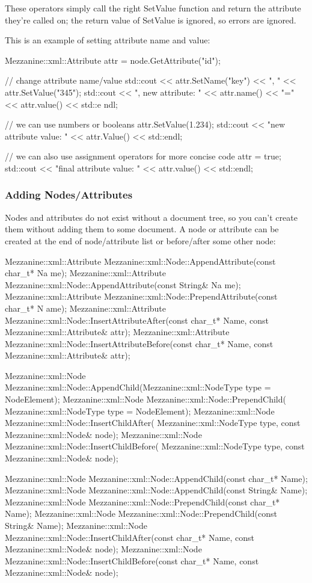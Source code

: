  These operators simply call the right SetValue function and return the attribute they're called on; the return value of SetValue is ignored, so errors are ignored. \par
 \par
 This is an example of setting attribute name and value: 
\begin{DoxyCode}
 Mezzanine::xml::Attribute attr = node.GetAttribute("id");

 // change attribute name/value
 std::cout << attr.SetName("key") << ", " << attr.SetValue("345");
 std::cout << ", new attribute: " << attr.name() << "=" << attr.value() << std::e
      ndl;

 // we can use numbers or booleans
 attr.SetValue(1.234);
 std::cout << "new attribute value: " << attr.Value() << std::endl;

 // we can also use assignment operators for more concise code
 attr = true;
 std::cout << "final attribute value: " << attr.value() << std::endl;
\end{DoxyCode}
 \hypertarget{XMLManual_XMLModifyingAdding}{}\subsubsection{Adding Nodes/Attributes}\label{XMLManual_XMLModifyingAdding}
Nodes and attributes do not exist without a document tree, so you can't create them without adding them to some document. A node or attribute can be created at the end of node/attribute list or before/after some other node: 
\begin{DoxyCode}
 Mezzanine::xml::Attribute Mezzanine::xml::Node::AppendAttribute(const char_t* Na
      me);
 Mezzanine::xml::Attribute Mezzanine::xml::Node::AppendAttribute(const String& Na
      me);
 Mezzanine::xml::Attribute Mezzanine::xml::Node::PrependAttribute(const char_t* N
      ame);
 Mezzanine::xml::Attribute Mezzanine::xml::Node::InsertAttributeAfter(const 
      char_t* Name, const Mezzanine::xml::Attribute& attr);
 Mezzanine::xml::Attribute Mezzanine::xml::Node::InsertAttributeBefore(const 
      char_t* Name, const Mezzanine::xml::Attribute& attr);

 Mezzanine::xml::Node Mezzanine::xml::Node::AppendChild(Mezzanine::xml::NodeType 
      type = NodeElement);
 Mezzanine::xml::Node Mezzanine::xml::Node::PrependChild(
      Mezzanine::xml::NodeType type = NodeElement);
 Mezzanine::xml::Node Mezzanine::xml::Node::InsertChildAfter(
      Mezzanine::xml::NodeType type, const Mezzanine::xml::Node& node);
 Mezzanine::xml::Node Mezzanine::xml::Node::InsertChildBefore(
      Mezzanine::xml::NodeType type, const Mezzanine::xml::Node& node);

 Mezzanine::xml::Node Mezzanine::xml::Node::AppendChild(const char_t* Name);
 Mezzanine::xml::Node Mezzanine::xml::Node::AppendChild(const String& Name);
 Mezzanine::xml::Node Mezzanine::xml::Node::PrependChild(const char_t* Name);
 Mezzanine::xml::Node Mezzanine::xml::Node::PrependChild(const String& Name);
 Mezzanine::xml::Node Mezzanine::xml::Node::InsertChildAfter(const char_t* Name, 
      const Mezzanine::xml::Node& node);
 Mezzanine::xml::Node Mezzanine::xml::Node::InsertChildBefore(const char_t* Name,
       const Mezzanine::xml::Node& node);
\end{DoxyCode}
